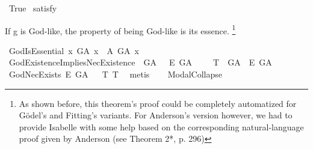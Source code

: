 \begin{isabellebody}
%
%
%
\isanewline
{}\isamarkupfalse%
\ True\ \isamarkupfalse%
{\isacharbrackleft}satisfy{\isacharbrackright}%
\ %
%
\isamarkupfalse%
\ %
%
%
%
%
\begin{isamarkuptext}%
If g is God-like, the property of being God-like is its essence.
\footnote{As shown before, this theorem's proof could be completely automatized for G\"odel's and Fitting's variants.
For Anderson's version however, we had to provide Isabelle with some help based on the corresponding natural-language proof 
given by Anderson (see \cite{anderson90:_some_emend_of_goedel_ontol_proof} Theorem 2*, p. 296)}%
\end{isamarkuptext}\isamarkuptrue%
\isamarkupfalse%
\ GodIsEssential{\isacharcolon}\ {\isachardoublequoteopen}{\isasymlfloor}\isactrlbold {\isasymforall}x{\isachardot}\ G\isactrlsup A\ x\ \isactrlbold {\isasymrightarrow}\ {\isacharparenleft}{\isasymE}\isactrlsup A\ G\isactrlsup A\ x{\isacharparenright}{\isasymrfloor}{\isachardoublequoteclose}%
\ %
%
\isamarkupfalse%
\ {\isacharminus}\ %
%
%
%
\isamarkupfalse%
\ GodExistenceImpliesNecExistence{\isacharcolon}\ {\isachardoublequoteopen}{\isasymlfloor}\isactrlbold {\isasymexists}\ G\isactrlsup A\ \isactrlbold {\isasymrightarrow}\ \ \isactrlbold {\isasymbox}\isactrlbold {\isasymexists}\isactrlsup E\ G\isactrlsup A{\isasymrfloor}{\isachardoublequoteclose}%
\ %
%
\isamarkupfalse%
\ {\isacharminus}%
%
%
%
%
%
%
%
%
%
%
%
%
%
%
\isamarkupfalse%
\ T{}{\isacharcolon}\ {\isachardoublequoteopen}{\isasymlfloor}\isactrlbold {\isasymdiamond}\isactrlbold {\isasymexists}\ G\isactrlsup A{\isasymrfloor}\ {\isasymlongrightarrow}\ {\isasymlfloor}\isactrlbold {\isasymbox}\isactrlbold {\isasymexists}\isactrlsup E\ G\isactrlsup A{\isasymrfloor}{\isachardoublequoteclose}%
\ %
%
\isamarkupfalse%
\ {\isacharminus}\ %
%
%
%
\isamarkupfalse%
\ GodNecExists{\isacharcolon}\ {\isachardoublequoteopen}{\isasymlfloor}\isactrlbold {\isasymbox}\isactrlbold {\isasymexists}\isactrlsup E\ G\isactrlsup A{\isasymrfloor}{\isachardoublequoteclose}%
\ %
%
\isamarkupfalse%
\ T{}\ T{}\ \isamarkupfalse%
\ metis\ %
%
%
%
\ \isanewline
{}\isamarkupfalse%
\ ModalCollapse{\isacharcolon}\ {\isachardoublequoteopen}{\isasymlfloor}\isactrlbold {\isasymforall}{\isasymPhi}{\isachardot}{\isacharparenleft}{\isasymPhi}\ \isactrlbold {\isasymrightarrow}\ {\isacharparenleft}\isactrlbold {\isasymbox}\ {\isasymPhi}{\isacharparenright}{\isacharparenright}{\isasymrfloor}{\isachardoublequoteclose}\ \isamarkupfalse%

\end{isabellebody}
